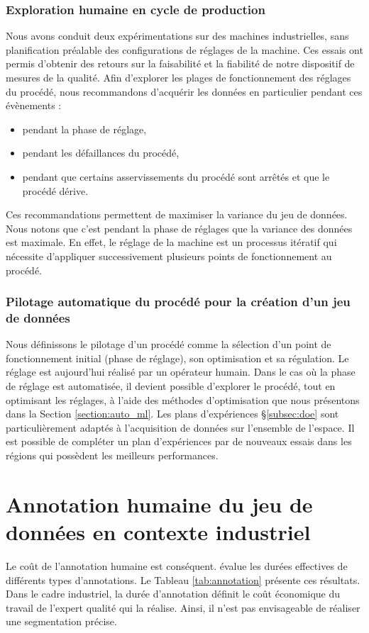 \subsubsection{Exploration humaine en cycle de production}
Nous avons conduit deux expérimentations sur des machines industrielles, sans planification préalable des configurations de réglages de la machine.
Ces essais ont permis d'obtenir des retours sur la faisabilité et la fiabilité de notre dispositif de mesures de la qualité.
Afin d'explorer les plages de fonctionnement des réglages du procédé, nous recommandons d'acquérir les données en particulier pendant ces évènements :
\begin{itemize}
\item pendant la phase de réglage,
\item pendant les défaillances du procédé,
\item pendant que certains asservissements du procédé sont arrêtés et que le procédé dérive.
\end{itemize}
Ces recommandations permettent de maximiser la variance du jeu de données.
Nous notons que c'est pendant la phase de réglages que la variance des données est maximale.
En effet, le réglage de la machine est un processus itératif qui nécessite d'appliquer successivement plusieurs points de fonctionnement au procédé.

\subsubsection{Pilotage automatique du procédé pour la création d'un jeu de données}
Nous définissons le pilotage d'un procédé comme la sélection d'un point de fonctionnement initial (phase de réglage), son optimisation et sa régulation.
Le réglage est aujourd'hui réalisé par un opérateur humain.
Dans le cas où la phase de réglage est automatisée, il devient possible d'explorer le procédé, tout en optimisant les réglages, à l'aide des méthodes d'optimisation que nous présentons dans la Section \ref{section:auto_ml}.
Les plans d'expériences §\ref{subsec:doe} sont particulièrement adaptés à l'acquisition de données sur l'ensemble de l'espace.
Il est possible de compléter un plan d'expériences par de nouveaux essais dans les régions qui possèdent les meilleurs performances.

\section{Annotation humaine du jeu de données en contexte industriel}
Le coût de l'annotation humaine est conséquent.
\cite{bearman_what_2015} évalue les durées effectives de différents types d'annotations.
Le Tableau \ref{tab:annotation} présente ces résultats.
Dans le cadre industriel, la durée d'annotation définit le coût économique du travail de l'expert qualité qui la réalise.
Ainsi, il n'est pas envisageable de réaliser une segmentation précise.

